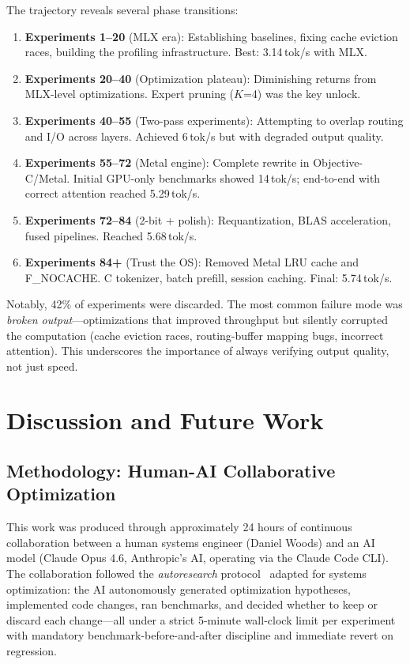 \documentclass[11pt,twocolumn]{article}
\begin{document}
The trajectory reveals several phase transitions:
\begin{enumerate}[leftmargin=*,itemsep=2pt]
    \item \textbf{Experiments 1--20} (MLX era): Establishing baselines, fixing cache eviction races, building the profiling infrastructure. Best: 3.14\,tok/s with MLX.
    \item \textbf{Experiments 20--40} (Optimization plateau): Diminishing returns from MLX-level optimizations. Expert pruning ($K$=4) was the key unlock.
    \item \textbf{Experiments 40--55} (Two-pass experiments): Attempting to overlap routing and I/O across layers. Achieved 6\,tok/s but with degraded output quality.
    \item \textbf{Experiments 55--72} (Metal engine): Complete rewrite in Objective-C/Metal. Initial GPU-only benchmarks showed 14\,tok/s; end-to-end with correct attention reached 5.29\,tok/s.
    \item \textbf{Experiments 72--84} (2-bit + polish): Requantization, BLAS acceleration, fused pipelines. Reached 5.68\,tok/s.
    \item \textbf{Experiments 84+} (Trust the OS): Removed Metal LRU cache and F\_NOCACHE. C tokenizer, batch prefill, session caching. Final: 5.74\,tok/s.
\end{enumerate}

Notably, 42\% of experiments were discarded.
The most common failure mode was \emph{broken output}---optimizations that improved throughput but silently corrupted the computation (cache eviction races, routing-buffer mapping bugs, incorrect attention).
This underscores the importance of always verifying output quality, not just speed.

\section{Discussion and Future Work}

\subsection{Methodology: Human-AI Collaborative Optimization}

This work was produced through approximately 24 hours of continuous collaboration between a human systems engineer (Daniel Woods) and an AI model (Claude Opus 4.6, Anthropic's AI, operating via the Claude Code CLI).
The collaboration followed the \emph{autoresearch} protocol~\cite{karpathy2025autoresearch} adapted for systems optimization: the AI autonomously generated optimization hypotheses, implemented code changes, ran benchmarks, and decided whether to keep or discard each change---all under a strict 5-minute wall-clock limit per experiment with mandatory benchmark-before-and-after discipline and immediate revert on regression.
\end{document}
